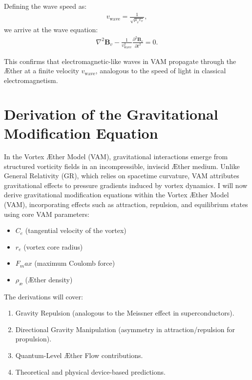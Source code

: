 \documentclass[a4paper,12pt]{article}
\begin{document}
Defining the wave speed as:
\begin{align}
    v_\text{wave} = \frac{1}{\sqrt{\mu_v \varepsilon_v}},
\end{align}
we arrive at the wave equation:
\begin{align}
    \nabla^2 \mathbf{B}_v - \frac{1}{v_\text{wave}^2} \frac{\partial^2 \mathbf{B}_v}{\partial t^2} = 0.
\end{align}

This confirms that electromagnetic-like waves in VAM propagate through the Æther at a finite velocity \( v_\text{wave} \), analogous to the speed of light in classical electromagnetism.
\label{appendix:10}
\section{Derivation of the Gravitational Modification Equation}


In the Vortex Æther Model (VAM), gravitational interactions emerge from structured vorticity fields in an incompressible, inviscid Æther medium. Unlike General Relativity (GR), which relies on spacetime curvature, VAM attributes gravitational effects to pressure gradients induced by vortex dynamics. I will now derive gravitational modification equations within the Vortex Æther Model (VAM), incorporating effects such as attraction, repulsion, and equilibrium states using core VAM parameters:

\begin{itemize}
    \item $C_e$ (tangential velocity of the vortex)
    \item $r_e$ (vortex core radius)
    \item $F_max$ (maximum Coulomb force)
    \item $\rho_\text{\ae}$ (Æther density)
\end{itemize}

The derivations will cover:

\begin{enumerate}
    \item Gravity Repulsion (analogous to the Meissner effect in superconductors).
    \item Directional Gravity Manipulation (asymmetry in attraction/repulsion for propulsion).
    \item Quantum-Level Æther Flow contributions.
    \item Theoretical and physical device-based predictions.
\end{enumerate}
\end{document}
